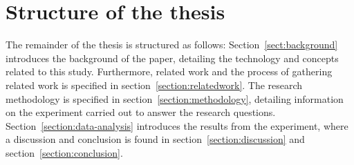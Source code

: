 
\section{Structure of the thesis}
The remainder of the thesis is structured as follows: Section~\ref{sect:background} introduces the background of the paper, detailing the technology and concepts related to this study. Furthermore, related work and the process of gathering related work is specified in section~\ref{section:relatedwork}. The research methodology is specified in section~\ref{section:methodology}, detailing information on the experiment carried out to answer the research questions. Section~\ref{section:data-analysis} introduces the results from the experiment, where a discussion and conclusion is found in section~\ref{section:discussion} and section~\ref{section:conclusion}.  


